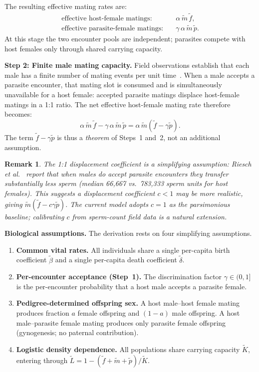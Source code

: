\documentclass[12pt]{article}
\newtheorem{remark}{Remark}
\begin{document}
The resulting effective mating rates are:
\begin{align*}
  \text{effective host-female matings:}   &\quad \alpha\,\tilde{m}\,\tilde{f}, \\
  \text{effective parasite-female matings:} &\quad \gamma\,\alpha\,\tilde{m}\,\tilde{p}.
\end{align*}
At this stage the two encounter pools are independent; parasites compete
with host females only through shared carrying capacity.

\noindent\textbf{Step 2: Finite male mating capacity.}
Field observations establish that each male has a finite number of
mating events per unit time~\citep{Balsano1989}.  When a male accepts a
parasite encounter, that mating slot is consumed and is simultaneously
unavailable for a host female: accepted parasite matings displace
host-female matings in a 1:1 ratio.  The net effective host-female
mating rate therefore becomes:
\[
  \alpha\,\tilde{m}\,\tilde{f} - \gamma\,\alpha\,\tilde{m}\,\tilde{p}
  = \alpha\,\tilde{m}\!\left(\tilde{f} - \gamma\tilde{p}\right).
\]
The term $\tilde{f} - \gamma\tilde{p}$ is thus a \emph{theorem} of
Steps~1 and~2, not an additional assumption.

\begin{remark}
The 1:1 displacement coefficient is a simplifying assumption: Riesch
et al.~\citeyearpar{Riesch2008} report that when males do accept
parasite encounters they transfer substantially less sperm (median
66{,}667 vs.\ 783{,}333 sperm units for host females).  This suggests
a displacement coefficient $c < 1$ may be more realistic, giving
$\tilde{m}(\tilde{f} - c\gamma\tilde{p})$.  The current model adopts
$c = 1$ as the parsimonious baseline; calibrating $c$ from sperm-count
field data is a natural extension.
\end{remark}

\noindent\textbf{Biological assumptions.}
The derivation rests on four simplifying assumptions.

\begin{enumerate}
  \item \textbf{Common vital rates.}  All individuals share a single
    per-capita birth coefficient $\tilde{\beta}$ and a single per-capita
    death coefficient $\tilde{\delta}$.

  \item \textbf{Per-encounter acceptance (Step~1).}  The discrimination
    factor $\gamma \in (0,1]$ is the per-encounter probability that a
    host male accepts a parasite female.

  \item \textbf{Pedigree-determined offspring sex.}  A host male--host
    female mating produces fraction $a$ female offspring and $(1-a)$
    male offspring.  A host male--parasite female mating produces only
    parasite female offspring (gynogenesis; no paternal contribution).

  \item \textbf{Logistic density dependence.}  All populations share
    carrying capacity $\tilde{K}$, entering through
    $\tilde{L} = 1 - (\tilde{f}+\tilde{m}+\tilde{p})/\tilde{K}$.
\end{enumerate}
\end{document}
